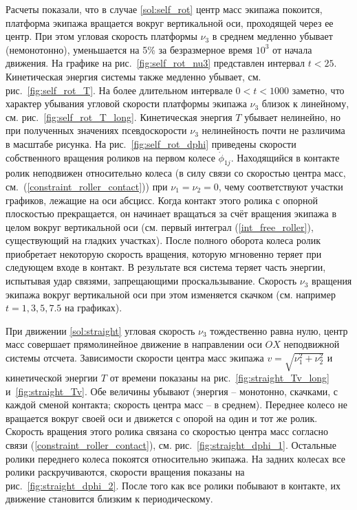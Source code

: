 Расчеты показали, что в случае \ref{sol:self_rot} центр масс экипажа покоится, платформа экипажа вращается вокруг вертикальной оси, проходящей через ее центр. При этом угловая скорость платформы $\nu_3$ в среднем медленно убывает (немонотонно), уменьшается на 5\%  за безразмерное время $10^3$ от начала движения. На графике на рис.~\ref{fig:self_rot_nu3} представлен интервал $t < 25$. Кинетическая энергия системы также медленно убывает, см. рис.~\ref{fig:self_rot_T}. На более длительном интервале $0 < t < 1000$ заметно, что характер убывания угловой скорости платформы экипажа $\nu_3$ близок к линейному, см. рис.~\ref{fig:self_rot_T_long}. Кинетическая энергия $T$ убывает нелинейно, но при полученных значениях псевдоскорости $\nu_3$  нелинейность почти не различима в масштабе рисунка. На рис.~\ref{fig:self_rot_dphi} приведены скорости собственного вращения роликов на первом колесе $\dot{\phi}_{1j}$. Находящийся в контакте ролик неподвижен относительно колеса (в силу связи со скоростью центра масс, см.~(\ref{constraint_roller_contact})) при $\nu_1 = \nu_2 = 0$, чему соответствуют участки графиков, лежащие на оси абсцисс. Когда контакт этого ролика с опорной плоскостью прекращается, он начинает вращаться за счёт вращения экипажа в целом вокруг вертикальной оси (см. первый интеграл (\ref{int_free_roller}), существующий на гладких участках). После полного оборота колеса ролик приобретает некоторую скорость вращения, которую мгновенно теряет при следующем входе в контакт. В результате вся система теряет часть энергии, испытывая удар связями, запрещающими проскальзывание. Скорость $\nu_3$ вращения экипажа вокруг вертикальной оси при этом изменяется скачком (см. например $t=1, 3, 5, 7.5$ на графиках).

При движении \ref{sol:straight} угловая скорость $\nu_3$ тождественно равна нулю, центр масс совершает прямолинейное движение в направлении оси $OX$ неподвижной системы отсчета. Зависимости скорости центра масс экипажа $v = \sqrt{\nu_1^2+\nu_2^2}$ и кинетической энергии $T$ от времени показаны на рис.~\ref{fig:straight_Tv_long} и~\ref{fig:straight_Tv}. Обе величины убывают (энергия -- монотонно, скачками, с каждой сменой контакта; скорость центра масс -- в среднем). Переднее колесо не вращается вокруг своей оси и движется с опорой на один и тот же ролик. Скорость вращения этого ролика связана со скоростью центра масс согласно связи (\ref{constraint_roller_contact}), см. рис.~\ref{fig:straight_dphi_1}. Остальные ролики переднего колеса покоятся относительно экипажа. На задних колесах все ролики раскручиваются, скорости вращения показаны на рис.~\ref{fig:straight_dphi_2}. После того как все ролики побывают в контакте, их движение становится близким к периодическому.


